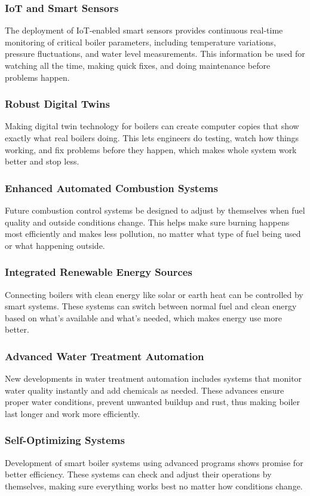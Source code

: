 \subsubsection{IoT and Smart Sensors}
The deployment of IoT-enabled smart sensors provides continuous real-time monitoring of critical boiler parameters, including temperature variations, pressure fluctuations, and water level measurements. This information be used for watching all the time, making quick fixes, and doing maintenance before problems happen.

\subsubsection{Robust Digital Twins}
Making digital twin technology for boilers can create computer copies that show exactly what real boilers doing. This lets engineers do testing, watch how things working, and fix problems before they happen, which makes whole system work better and stop less.

\subsubsection{Enhanced Automated Combustion Systems}
Future combustion control systems be designed to adjust by themselves when fuel quality and outside conditions change. This helps make sure burning happens most efficiently and makes less pollution, no matter what type of fuel being used or what happening outside.

\subsubsection{Integrated Renewable Energy Sources}
Connecting boilers with clean energy like solar or earth heat can be controlled by smart systems. These systems can switch between normal fuel and clean energy based on what's available and what's needed, which makes energy use more better.

\subsubsection{Advanced Water Treatment Automation}
New developments in water treatment automation includes systems that monitor water quality instantly and add chemicals as needed. These advances ensure proper water conditions, prevent unwanted buildup and rust, thus making boiler last longer and work more efficiently.

\subsubsection{Self-Optimizing Systems}
Development of smart boiler systems using advanced programs shows promise for better efficiency. These systems can check and adjust their operations by themselves, making sure everything works best no matter how conditions change.